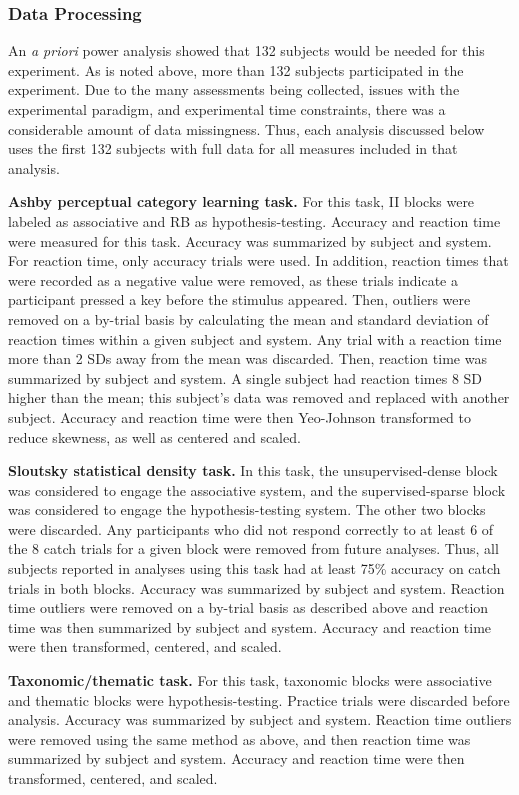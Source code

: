 \documentclass[../dissertation.tex]{subfiles}
\begin{document}
\subsubsection{Data Processing}
	An \textit{a priori} power analysis showed that 132 subjects would be needed for this experiment. As is noted above, more than 132 subjects participated in the experiment. Due to the many assessments being collected, issues with the experimental paradigm, and experimental time constraints, there was a considerable amount of data missingness. Thus, each analysis discussed below uses the first 132 subjects with full data for all measures included in that analysis. \par
	\textbf{Ashby perceptual category learning task.} For this task, II blocks were labeled as associative and RB as hypothesis-testing. Accuracy and reaction time were measured for this task. Accuracy was summarized by subject and system. For reaction time, only accuracy trials were used. In addition, reaction times that were recorded as a negative value were removed, as these trials indicate a participant pressed a key before the stimulus appeared. Then, outliers were removed on a by-trial basis by calculating the mean and standard deviation of reaction times within a given subject and system. Any trial with a reaction time more than 2 SDs away from the mean was discarded. Then, reaction time was summarized by subject and system. A single subject had reaction times 8 SD higher than the mean; this subject's data was removed and replaced with another subject. Accuracy and reaction time were then Yeo-Johnson transformed to reduce skewness, as well as centered and scaled. \par
	\textbf{Sloutsky statistical density task.} In this task, the unsupervised-dense block was considered to engage the associative system, and the supervised-sparse block was considered to engage the hypothesis-testing system. The other two blocks were discarded. Any participants who did not respond correctly to at least 6 of the 8 catch trials for a given block were removed from future analyses. Thus, all subjects reported in analyses using this task had at least 75\% accuracy on catch trials in both blocks. Accuracy was summarized by subject and system. Reaction time outliers were removed on a by-trial basis as described above and reaction time was then summarized by subject and system. Accuracy and reaction time were then transformed, centered, and scaled. \par
	\textbf{Taxonomic/thematic task.} For this task, taxonomic blocks were associative and thematic blocks were hypothesis-testing. Practice trials were discarded before analysis. Accuracy was summarized by subject and system. Reaction time outliers were removed using the same method as above, and then reaction time was summarized by subject and system. Accuracy and reaction time were then transformed, centered, and scaled. \par
\end{document}
